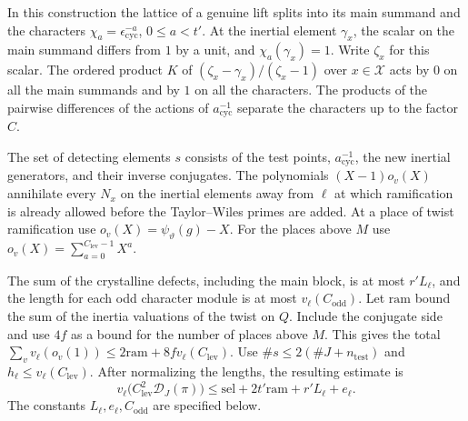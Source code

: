 In this construction the lattice of a genuine lift splits into
its main summand and the characters
\(\chi_a=\epsilon_{\mathrm{cyc}}^{-a}\), \(0\le a<t'\).
At the inertial element \(\gamma_x\), the scalar on the main summand
differs from \(1\) by a unit, and \(\chi_a(\gamma_x)=1\).
Write \(\zeta_x\) for this scalar. The ordered product \(K\) of
\((\zeta_x-\gamma_x)/(\zeta_x-1)\) over \(x\in\mathcal X\) acts by
\(0\) on all the main summands and by \(1\) on all the characters.
The products of the pairwise differences of
the actions of \(a_{\mathrm{cyc}}^{-1}\) separate the characters
up to the factor \(C\).

The set of detecting elements \(s\) consists of the
test points, \(a_{\mathrm{cyc}}^{-1}\), the new inertial generators,
and their inverse conjugates. The polynomials \((X-1)o_v(X)\)
annihilate every \(N_x\) on the inertial elements away from \(\ell\)
at which ramification is already allowed before the Taylor--Wiles
primes are added. At a place of twist ramification use
\(o_v(X)=\psi_\vartheta(g)-X\). For the places above \(M\) use
\(o_v(X)=\sum_{a=0}^{C_{\mathrm{lev}}-1}X^a\).






The sum of the crystalline defects, including the main block,
is at most \(r'L_\ell\), and the length for each odd character
module is at most \(v_\ell(C_{\mathrm{odd}})\). Let \(\mathrm{ram}\)
bound the sum of the inertia valuations of the twist on \(Q\).
Include the conjugate side and use \(4f\) as a bound for the number
of places above \(M\). This gives the total
\(\sum_v v_\ell(o_v(1))\le2\mathrm{ram}+8f v_\ell(C_{\mathrm{lev}})\).
Use \(\#s\le 2(\#J+n_{\mathrm{test}})\) and
\(h_\ell\le v_\ell(C_{\mathrm{lev}})\). After normalizing the lengths,
the resulting estimate is
\begin{equation}
 v_\ell\bigl(C_{\mathrm{lev}}^2\mathcal D_J(\pi)\bigr)
 \le \mathrm{sel}+2t'\mathrm{ram}+r'L_\ell+e_\ell .
 \label{eq:ribet-top-valuation}
\end{equation}
The constants \(L_\ell,e_\ell,C_{\mathrm{odd}}\) are specified below.

